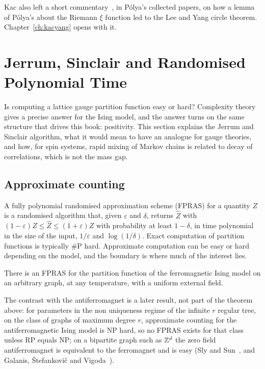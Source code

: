 Kac also left a short commentary~\cite{Ka74}, in P\'olya's collected papers, on how a lemma of P\'olya's about the Riemann $\xi$ function led to the Lee and Yang circle theorem. Chapter~\ref{ch:kacyang} opens with it.

\section{Jerrum, Sinclair and Randomised Polynomial Time}\label{ch:jerrum}

Is computing a lattice gauge partition function easy or hard? Complexity theory gives a precise answer for the Ising model, and the answer turns on the same structure that drives this book: positivity. This section explains the Jerrum and Sinclair algorithm, what it would mean to have an analogue for gauge theories, and how, for spin systems, rapid mixing of Markov chains is related to decay of correlations, which is not the mass gap.

\subsection{Approximate counting}\label{sec:c5counting}

A fully polynomial randomised approximation scheme (FPRAS) for a quantity $Z$ is a randomised algorithm that, given $\varepsilon$ and $\delta$, returns $\hat Z$ with $(1-\varepsilon)Z\le\hat Z\le(1+\varepsilon)Z$ with probability at least $1-\delta$, in time polynomial in the size of the input, $1/\varepsilon$ and $\log(1/\delta)$. Exact computation of partition functions is typically $\#$P hard. Approximate computation can be easy or hard depending on the model, and the boundary is where much of the interest lies.

\begin{theorem}
There is an FPRAS for the partition function of the ferromagnetic Ising model on an arbitrary graph, at any temperature, with a uniform external field.
\end{theorem}

The contrast with the antiferromagnet is a later result, not part of the theorem above: for parameters in the non uniqueness regime of the infinite $r$ regular tree, on the class of graphs of maximum degree $r$, approximate counting for the antiferromagnetic Ising model is NP hard, so no FPRAS exists for that class unless RP equals NP; on a bipartite graph such as $\mathbb{Z}^d$ the zero field antiferromagnet is equivalent to the ferromagnet and is easy (Sly and Sun~\cite{SS12}, and Galanis, \v{S}tefankovi\v{c} and Vigoda~\cite{GSV16}).

